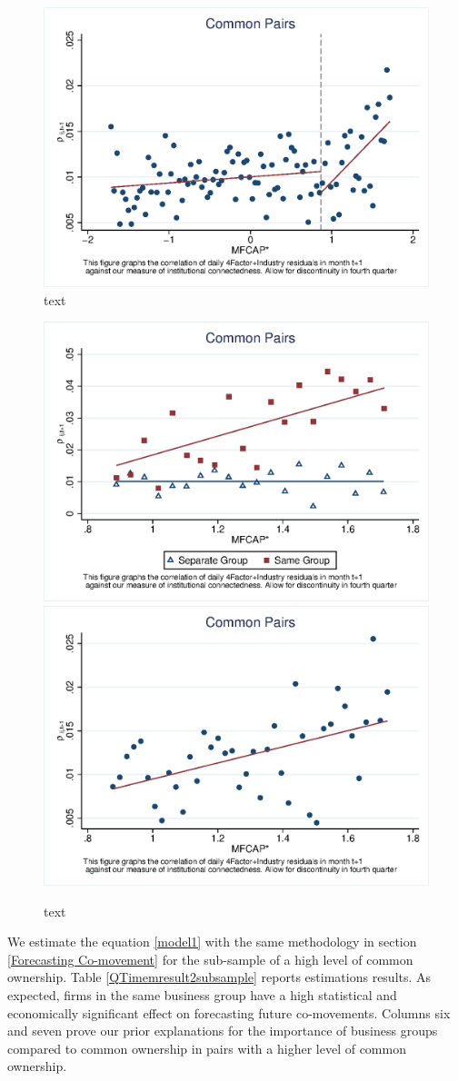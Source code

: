 			\begin{figure}[htbp]
				\centering  
				\includegraphics[width=0.6\linewidth]{"Output/Qmcorr5lrd.eps"}
				\caption{text}
				\label{Qmcorr5lrd}
			\end{figure}
			\begin{figure}[htbp]
				\centering  
				\includegraphics[width=0.45\linewidth]{"Output/Qmcorr5lrdbgsubsample.eps"}
				\includegraphics[width=0.45\linewidth]{"Output/Qmcorr5subsample.eps"}
				\caption{text}
				\label{Qmcorr5subsample}
			\end{figure}
			
			
			We estimate the equation \ref{model1} with the same methodology in section \ref{Forecasting Co-movement}  for the sub-sample of a high level of common ownership. Table \ref{QTimemresult2subsample} reports estimations results. As expected, firms in the same business group have a high statistical and economically significant effect on forecasting future co-movements. Columns six and seven prove our prior explanations for the importance of business groups compared to common ownership in pairs with a higher level of common ownership.
			
